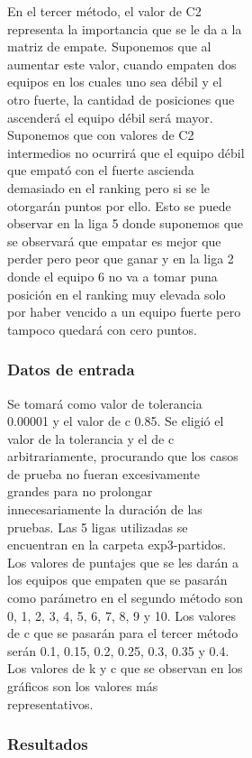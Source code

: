 \begin{figure}[h]
\begin{figure}[h]
\begin{figure}[h]
            En el tercer método, el valor de C2 representa la importancia que se le da a la matriz de empate. Suponemos que al aumentar este valor, cuando empaten dos equipos en los cuales uno sea débil y el otro fuerte, la cantidad de posiciones que ascenderá el equipo débil será mayor. Suponemos que con valores de C2 intermedios no ocurrirá que el equipo débil que empató con el fuerte ascienda demasiado en el ranking pero si se le otorgarán puntos por ello. Esto se puede observar en la liga 5 donde suponemos que se observará que empatar es mejor que perder pero peor que ganar y en la liga 2 donde el equipo 6 no va a tomar puna posición en el ranking muy elevada solo por haber vencido a un equipo fuerte pero tampoco quedará con cero puntos.

            \subsubsection*{Datos de entrada}
            Se tomará como valor de tolerancia 0.00001 y el valor de c 0.85. Se eligió el valor de la tolerancia y el de c arbitrariamente, procurando que los casos de prueba no fueran excesivamente grandes para no prolongar innecesariamente la duración de las pruebas. Las 5 ligas utilizadas se encuentran en la carpeta exp3-partidos. Los valores de puntajes que se les darán a los equipos que empaten que se pasarán como parámetro en el segundo método son 0, 1, 2, 3, 4, 5, 6, 7, 8, 9 y 10. Los valores de c que se pasarán para el tercer método serán 0.1, 0.15, 0.2, 0.25, 0.3, 0.35 y 0.4. Los valores de k y c que se observan en los gráficos son los valores más representativos.

            \subsubsection*{Resultados}

             \begin{figure}
                \begin{center}


\end{center}
\end{figure}
\end{figure}
\end{figure}
\end{figure}
